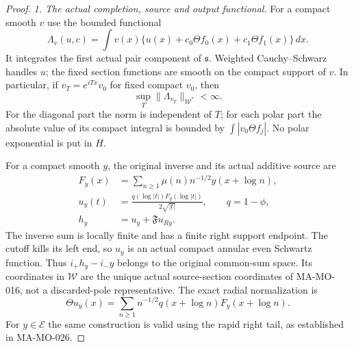 \begin{proof}
\emph{1. The actual completion, source and output functional.}
For a compact smooth $v$ use the bounded functional
\[
 \Lambda_v(u,c)=\int v(x)
       \{u(x)+c_0\Theta f_0(x)+c_1\Theta f_1(x)\}\,dx.
 \tag{MA-MO.1304}
\]
It integrates the first actual pair component of $\mathfrak s$.
Weighted Cauchy--Schwarz handles $u$; the fixed section functions
are smooth on the compact support of $v$.
In particular, if $v_T=e^{iTx}v_0$ for fixed compact $v_0$, then
\[
 \sup_T\|\Lambda_{v_T}\|_{\mathcal W^*}<\infty.
 \tag{MA-MO.1305}
\]
For the diagonal part the norm is independent of $T$; for each
polar part the absolute value of its compact integral is bounded
by $\int|v_0\Theta f_j|$.  No polar exponential is put in $H$.

For a compact smooth $y$, the original inverse and its actual
additive source are
\[
 \begin{aligned}
 F_y(x)&=\sum_{n\ge1}\mu(n)n^{-1/2}y(x+\log n),\\
 u_y(t)&=\frac{q(\log|t|)F_y(\log|t|)}{2\sqrt{|t|}},
          \qquad q=1-\phi,\\
 h_y&=u_y+\mathfrak F u_{Ry}.
 \end{aligned}
 \tag{MA-MO.1306}
\]
The inverse sum is locally finite and has a finite right support
endpoint.  The cutoff kills its left end, so $u_y$ is an actual
compact annular even Schwartz function.  Thus $i_+h_y-i_-y$
belongs to the original common-sum space.  Its coordinates in
$\mathcal W$ are the unique actual source-section coordinates
of MA-MO-016, not a discarded-pole representative.
The exact radial normalization is
\[
 \Theta u_y(x)=\sum_{n\ge1}n^{-1/2}
                     q(x+\log n)F_y(x+\log n).
 \tag{MA-MO.1307}
\]
For $y\in\mathcal E$ the same construction is valid using
the rapid right tail, as established in MA-MO-026.


\end{proof}
